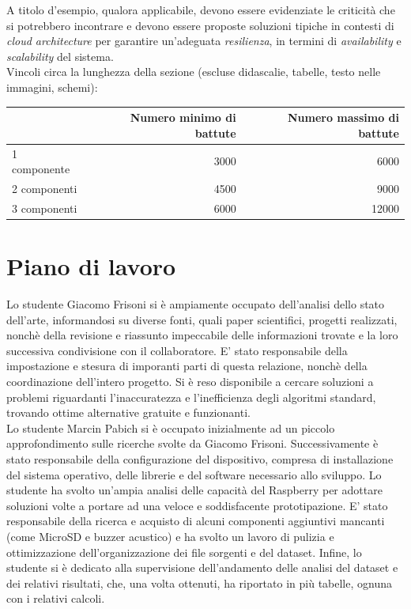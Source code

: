 \documentclass[12pt]{article}
\begin{document}
A titolo d’esempio, qualora applicabile, devono essere evidenziate le criticità che si potrebbero incontrare e devono essere proposte soluzioni tipiche in contesti di \textit{cloud architecture} per garantire un'adeguata \textit{resilienza}, in termini di \textit{availability} e \textit{scalability} del sistema.\\


Vincoli circa la lunghezza della sezione (escluse didascalie, tabelle, testo nelle immagini, schemi):

\vspace{1cm}
\begin{tabular}{l|rr}
 & Numero minimo di battute & Numero massimo di battute \\
 \hline
 1 componente & 3000 & 6000 \\
 2 componenti & 4500 & 9000 \\
 3 componenti & 6000 & 12000 \\
 \hline
\end{tabular}


\newpage



\section{Piano di lavoro}

Lo studente Giacomo Frisoni si è ampiamente occupato dell'analisi dello stato dell'arte, informandosi su diverse fonti, quali paper scientifici, progetti realizzati, nonchè della revisione e riassunto impeccabile delle informazioni trovate e la loro successiva condivisione con il collaboratore. E' stato responsabile della impostazione e stesura di imporanti parti di questa relazione, nonchè della coordinazione dell'intero progetto. Si è reso disponibile a cercare soluzioni a problemi riguardanti l'inaccuratezza e l'inefficienza degli algoritmi standard, trovando ottime alternative gratuite e funzionanti.\\

Lo studente Marcin Pabich si è occupato inizialmente ad un piccolo approfondimento sulle ricerche svolte da Giacomo Frisoni. Successivamente è stato responsabile della configurazione del dispositivo, compresa di installazione del sistema operativo, delle librerie e del software necessario allo sviluppo. Lo studente ha svolto un'ampia analisi delle capacità del Raspberry per adottare soluzioni volte a portare ad una veloce e soddisfacente prototipazione. E' stato responsabile della ricerca e acquisto di alcuni componenti aggiuntivi mancanti (come MicroSD e buzzer acustico) e ha svolto un lavoro di pulizia e ottimizzazione dell'organizzazione dei file sorgenti e del dataset. Infine, lo studente si è dedicato alla supervisione dell'andamento delle analisi del dataset e dei relativi risultati, che, una volta ottenuti, ha riportato in più tabelle, ognuna con i relativi calcoli.\\
\end{document}
